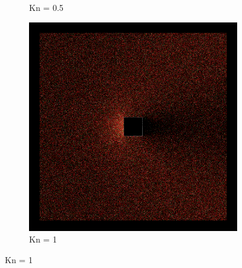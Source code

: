 \begin{figure}
\begin{subfigure}{0.32\textwidth}
        \caption{Kn = 0.5}
    \end{subfigure}
    \hfill
    \begin{subfigure}{0.32\textwidth}
        \centering
        \includegraphics[width=\textwidth]{Images/4. Results/Square Kn/particles/Kn1.png}
        \caption{Kn = 1}
    \end{subfigure}
    
    \vspace{5pt}
    

\end{figure}
